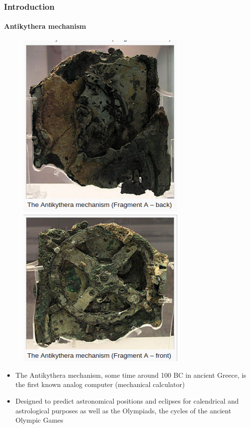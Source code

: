 \documentclass[hyperref={pdfpagelabels=true}]{beamer}
\begin{document}
\begin{frame}
\frametitle{Introduction}
\framesubtitle{Antikythera mechanism}
\begin{figure}[!tbp]
\centering
\includegraphics[scale = 0.35]{figs/bn.png}
\includegraphics[scale = 0.4]{figs/bm.png}
\end{figure}
\small{
\begin{itemize}
\item[\ding{45}] The Antikythera mechanism, some time around 100 BC in ancient Greece, is the first known analog computer (mechanical calculator)
\item[\ding{45}] Designed to predict astronomical positions and eclipses for calendrical and astrological purposes as well as the Olympiads, the cycles of the ancient Olympic Games
\end{itemize}}
\end{frame}
\end{document}
